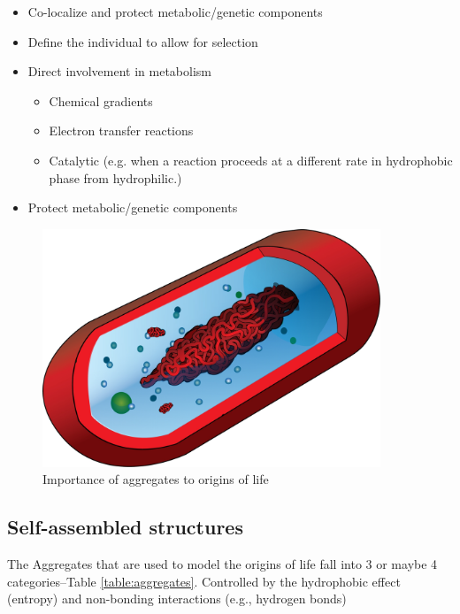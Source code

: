 \documentclass[]{article}
\begin{document}
\begin{itemize}
	\item  Co-localize and protect metabolic/genetic components
	\item  Define the individual to allow for 	selection
	\item  Direct involvement in metabolism
	\begin{itemize}
		\item 	Chemical gradients
		\item   Electron transfer reactions
		\item   Catalytic (e.g. when a reaction proceeds at a different rate in hydrophobic phase from hydrophilic.)
	\end{itemize}
	\item   Protect metabolic/genetic components
\end{itemize}

\begin{figure}[H]
	\caption{Importance of aggregates to origins of life}\label{fig:ImportanceOfAggregation}
	\includegraphics[width=0.9\textwidth]{ImportanceOfAggregation}
\end{figure}

\subsection{Self-assembled structures}

The Aggregates that are used to model the origins of life fall into 3 or maybe 4 categories--Table \ref{table:aggregates}.
Controlled by the hydrophobic effect (entropy) and non-bonding interactions (e.g., hydrogen bonds)
\end{document}
